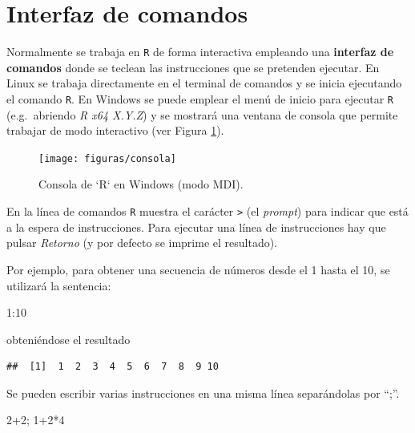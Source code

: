 \documentclass[
]{book}
\newenvironment{Shaded}{\begin{snugshade}}{\end{snugshade}}
\newcommand{\DecValTok}[1]{\textcolor[rgb]{0.00,0.00,0.81}{#1}}
\newcommand{\NormalTok}[1]{#1}
\newcommand{\SpecialCharTok}[1]{\textcolor[rgb]{0.00,0.00,0.00}{#1}}
\theoremstyle{break}
\theoremstyle{nonumberplain}
\begin{document}
\hypertarget{interfaz-de-comandos}{%
\section{Interfaz de comandos}\label{interfaz-de-comandos}}

Normalmente se trabaja en \texttt{R} de forma interactiva empleando una \textbf{interfaz de comandos} donde se teclean las instrucciones que se pretenden ejecutar.
En Linux se trabaja directamente en el terminal de comandos y se inicia ejecutando el comando \texttt{R}.
En Windows se puede emplear el menú de inicio para ejecutar \texttt{R} (e.g.~abriendo \emph{R x64 X.Y.Z}) y se mostrará una ventana de consola que permite trabajar de modo interactivo (ver Figura \ref{fig:consola}).

\begin{figure}[!htb]

{\centering \texttt{[image: figuras/consola]} 

}

\caption{Consola de `R` en Windows (modo MDI).}\label{fig:consola}
\end{figure}

En la línea de comandos \texttt{R} muestra el carácter \texttt{\textgreater{}} (el \emph{prompt}) para indicar que está a la espera de instrucciones.
Para ejecutar una línea de instrucciones hay que pulsar \emph{Retorno} (y por defecto se imprime el resultado).

Por ejemplo, para obtener una secuencia de números desde el 1 hasta el 10, se utilizará la sentencia:

\begin{Shaded}
\begin{Highlighting}[]
\DecValTok{1}\SpecialCharTok{:}\DecValTok{10}
\end{Highlighting}
\end{Shaded}

obteniéndose el resultado

\begin{verbatim}
##  [1]  1  2  3  4  5  6  7  8  9 10
\end{verbatim}

Se pueden escribir varias instrucciones en una misma línea separándolas por ``;''.

\begin{Shaded}
\begin{Highlighting}[]
\DecValTok{2}\SpecialCharTok{+}\DecValTok{2}\NormalTok{; }\DecValTok{1}\SpecialCharTok{+}\DecValTok{2}\SpecialCharTok{*}\DecValTok{4}
\end{Highlighting}
\end{Shaded}
\end{document}
